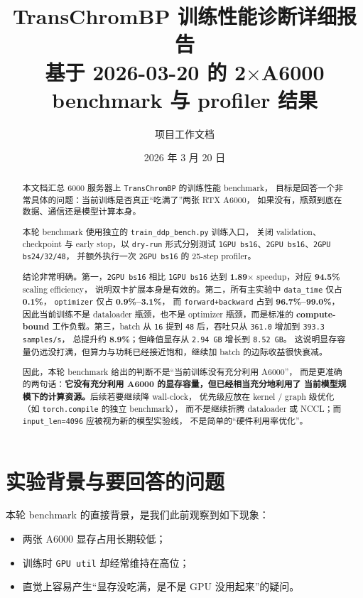 \documentclass[11pt,a4paper]{ctexart}
\title{TransChromBP 训练性能诊断详细报告\\
\large 基于 2026-03-20 的 2$\times$A6000 benchmark 与 profiler 结果}
\author{项目工作文档}
\date{2026 年 3 月 20 日}
\begin{document}
\maketitle

\begin{abstract}
本文档汇总 6000 服务器上 \texttt{TransChromBP} 的训练性能 benchmark，
目标是回答一个非常具体的问题：当前训练是否真正“吃满了”两张 RTX A6000，
如果没有，瓶颈到底在数据、通信还是模型计算本身。

本轮 benchmark 使用独立的 \texttt{train\_ddp\_bench.py} 训练入口，
关闭 validation、checkpoint 与 early stop，以 \texttt{dry-run} 形式分别测试
\texttt{1GPU bs16}、\texttt{2GPU bs16}、\texttt{2GPU bs24/32/48}，
并额外执行一次 \texttt{2GPU bs16} 的 25-step profiler。

结论非常明确。第一，\texttt{2GPU bs16} 相比 \texttt{1GPU bs16}
达到 \textbf{1.89$\times$} speedup，对应 \textbf{94.5\%} scaling efficiency，
说明双卡扩展本身是有效的。第二，所有主实验中
\texttt{data\_time} 仅占 \textbf{0.1\%}，
\texttt{optimizer} 仅占 \textbf{0.9\%--3.1\%}，
而 \texttt{forward+backward} 占到 \textbf{96.7\%--99.0\%}，
因此当前训练不是 dataloader 瓶颈，也不是 optimizer 瓶颈，而是标准的
\textbf{compute-bound} 工作负载。第三，batch 从 \texttt{16} 提到 \texttt{48}
后，吞吐只从 \texttt{361.0} 增加到 \texttt{393.3 samples/s}，
总提升约 \textbf{8.9\%}；但峰值显存从 \texttt{2.94 GB} 增长到 \texttt{8.52 GB}。
这说明显存容量仍远没打满，但算力与功耗已经接近饱和，继续加 batch 的边际收益很快衰减。

因此，本轮 benchmark 给出的判断不是“当前训练没有充分利用 A6000”，
而是更准确的两句话：\textbf{它没有充分利用 A6000 的显存容量，但已经相当充分地利用了
当前模型规模下的计算资源。}后续若要继续降 wall-clock，
优先级应放在 kernel / graph 级优化（如 \texttt{torch.compile} 的独立 benchmark），
而不是继续折腾 dataloader 或 NCCL；而 \texttt{input\_len=4096} 应被视为新的模型实验线，
不是简单的“硬件利用率优化”。
\end{abstract}

\section{实验背景与要回答的问题}

本轮 benchmark 的直接背景，是我们此前观察到如下现象：
\begin{itemize}[leftmargin=2em]
  \item 两张 A6000 显存占用长期较低；
  \item 训练时 \texttt{GPU util} 却经常维持在高位；
  \item 直觉上容易产生“显存没吃满，是不是 GPU 没用起来”的疑问。
\end{itemize}
\end{document}
